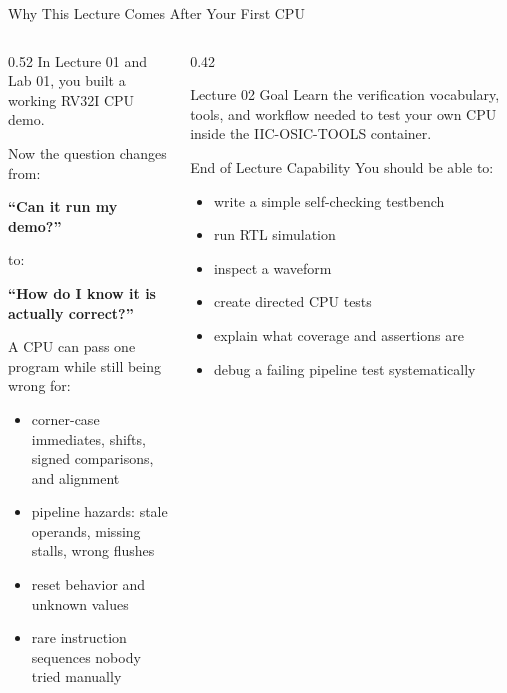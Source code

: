 \documentclass[aspectratio=169,10pt]{beamer}
\begin{document}
\begin{frame}{Why This Lecture Comes After Your First CPU}
  \begin{columns}[T]
    \begin{column}{0.52\textwidth}
      In Lecture 01 and Lab 01, you built a working RV32I CPU demo.

      \vspace{0.8em}
      Now the question changes from:
      \begin{center}
        \large\textbf{``Can it run my demo?''}
      \end{center}
      to:
      \begin{center}
        \large\textbf{``How do I know it is actually correct?''}
      \end{center}

      \vspace{0.8em}
      A CPU can pass one program while still being wrong for:
      \begin{itemize}
        \item corner-case immediates, shifts, signed comparisons, and alignment
        \item pipeline hazards: stale operands, missing stalls, wrong flushes
        \item reset behavior and unknown values
        \item rare instruction sequences nobody tried manually
      \end{itemize}
    \end{column}
    \begin{column}{0.42\textwidth}
      \begin{block}{Lecture 02 Goal}
        Learn the verification vocabulary, tools, and workflow needed to test your own CPU inside the IIC-OSIC-TOOLS container.
      \end{block}

      \vspace{0.6em}
      \begin{exampleblock}{End of Lecture Capability}
        You should be able to:
        \begin{itemize}\small
          \item write a simple self-checking testbench
          \item run RTL simulation
          \item inspect a waveform
          \item create directed CPU tests
          \item explain what coverage and assertions are
          \item debug a failing pipeline test systematically
        \end{itemize}
      \end{exampleblock}
    \end{column}
  \end{columns}
\end{frame}
\end{document}
